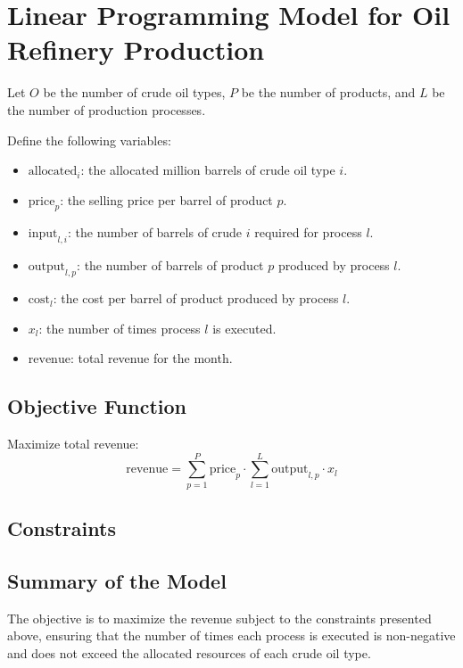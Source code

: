 \documentclass{article}
\begin{document}
\section*{Linear Programming Model for Oil Refinery Production}

Let \( O \) be the number of crude oil types, \( P \) be the number of products, and \( L \) be the number of production processes.

Define the following variables:
\begin{itemize}
    \item \( \text{allocated}_i \): the allocated million barrels of crude oil type \( i \).
    \item \( \text{price}_p \): the selling price per barrel of product \( p \).
    \item \( \text{input}_{l,i} \): the number of barrels of crude \( i \) required for process \( l \).
    \item \( \text{output}_{l,p} \): the number of barrels of product \( p \) produced by process \( l \).
    \item \( \text{cost}_l \): the cost per barrel of product produced by process \( l \).
    \item \( x_l \): the number of times process \( l \) is executed.
    \item \( \text{revenue} \): total revenue for the month.
\end{itemize}

\subsection*{Objective Function}
Maximize total revenue:
\[
\text{revenue} = \sum_{p=1}^{P} \text{price}_p \cdot \sum_{l=1}^{L} \text{output}_{l,p} \cdot x_l
\]

\subsection*{Constraints}

\subsection*{Summary of the Model}
The objective is to maximize the revenue subject to the constraints presented above, ensuring that the number of times each process is executed is non-negative and does not exceed the allocated resources of each crude oil type.
\end{document}
